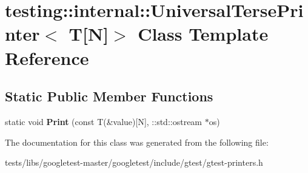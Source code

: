 \hypertarget{classtesting_1_1internal_1_1UniversalTersePrinter_3_01T[N]_4}{}\section{testing\+:\+:internal\+:\+:Universal\+Terse\+Printer$<$ T\mbox{[}N\mbox{]}$>$ Class Template Reference}
\label{classtesting_1_1internal_1_1UniversalTersePrinter_3_01T[N]_4}
\subsection*{Static Public Member Functions}
\begin{DoxyCompactItemize}
\item 
\mbox{\label{classtesting_1_1internal_1_1UniversalTersePrinter_3_01T[N]_4_a9e0ceb62fda7dc46ebcf5f911e459a49}} 
static void {\bfseries Print} (const T(\&value)\mbox{[}N\mbox{]}, \+::std\+::ostream $\ast$os)
\end{DoxyCompactItemize}


The documentation for this class was generated from the following file\+:\begin{DoxyCompactItemize}
\item 
tests/libs/googletest-\/master/googletest/include/gtest/gtest-\/printers.\+h\end{DoxyCompactItemize}

